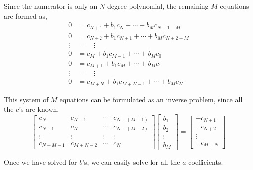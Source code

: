 \documentclass{article}
\theoremstyle{definition}
\begin{document}
Since the numerator is only an $N$-degree polynomial, the remaining $M$ equations are formed as,
\begin{align*}
0 &= c_{N+1} + b_1 c_{N} + \cdots + b_{M} c_{N+1-M}\\
0 &= c_{N+2} + b_1 c_{N+1}+ \cdots + b_{M} c_{N+2-M}\\
\vdots &= \quad\vdots\\
0 &= c_{M} + b_1 c_{M-1} + \cdots + b_{M}c_0\\
0 &= c_{M+1} + b_1 c_{M} + \cdots + b_{M}c_1\\
\vdots &= \quad\vdots\\
0 &= c_{M+N} + b_1 c_{M+N-1} + \cdots + b_{M}c_N
\end{align*}

This system of $M$ equations can be formulated as an inverse problem, since all the $c$'s are known. 
\[\begin{bmatrix}
c_{N} & c_{N-1} & \cdots & c_{N-(M-1)}\\
c_{N+1} & c_{N} & \cdots & c_{N-(M-2)}\\
\vdots & \vdots & \vdots & \vdots \\
c_{N+M-1} & c_{M+N-2} & \cdots & c_N
\end{bmatrix}\begin{bmatrix}
b_1\\
b_2\\
\vdots \\
b_M
\end{bmatrix} = \begin{bmatrix}
-c_{N+1}\\
-c_{N+2}\\
\vdots \\
-c_{M+N}
\end{bmatrix}\]

Once we have solved for $b$'s, we can easily solve for all the $a$ coefficients. 
\end{document}
